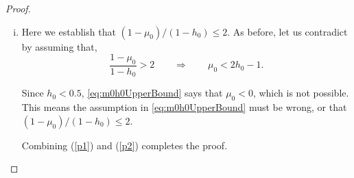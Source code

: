\documentclass{IEEEtran}
\begin{document}
\begin{proof}
\begin{enumerate}[(i)]
     \item \label{p2} Here we establish that $(1-\mu_0)/(1-h_0)\leq 2$. As before, let us contradict by assuming that,
         \begin{equation}\label{eq:m0h0UpperBound}
         \frac{1-\mu_0}{1-h_0} > 2  \qquad  \Rightarrow \qquad \mu_0 < 2h_0-1.
     \end{equation}

     Since $h_0<0.5$, \eqref{eq:m0h0UpperBound} says that $\mu_0<0$, which is not possible. This means the assumption in \eqref{eq:m0h0UpperBound} must be wrong, or that $(1-\mu_0)/(1-h_0)\leq 2$.

     Combining (\ref{p1}) and (\ref{p2}) completes the proof.
     \end{enumerate}
   \end{proof}
\end{document}
